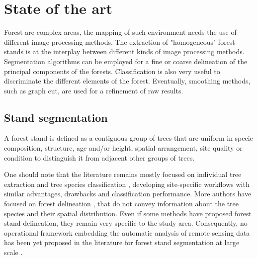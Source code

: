 \chapter{State of the art} %
\label{Chapter1} %

\startcontents[chapters]
\Mprintcontents





Forest are complex areas, the mapping of such environment needs the use of different image processing methods. The extraction of "homogeneous" forest stands is at the interplay between different kinds of image processing methods. Segmentation algorithms can be employed for a fine or coarse delineation of the principal components of the forests. Classification is also very useful to discriminate the different elements of the forest. Eventually, smoothing methods, such as graph cut, are used for a refinement of raw results.

\section{Stand segmentation}
A forest stand is defined as a contiguous group of trees that are uniform in specie composition, structure, age and/or height, spatial arrangement, site quality or condition to distinguish it from adjacent other groups of trees.

One should note that the literature remains mostly focused on individual tree extraction and tree species classification \citep{dalponte2014tree, vega2014ptrees, kandare2014new, }, developing site-specific workflows with similar advantages, drawbacks and classification performance. More authors have focused on forest delineation \citep{eysn2012forest}, that do not convey information about the tree species and their spatial distribution. Even if some methods have proposed forest stand delineation, they remain very specific to the study area. Consequently, no operational framework embedding the automatic analysis of remote sensing data has been yet proposed in the literature for forest stand segmentation at large scale \citep{clement_IJPRS}. \\

